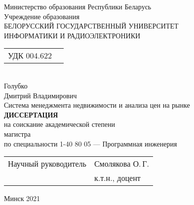 \begin{titlepage}
  \begin{center}
    Министерство образования Республики Беларусь\\[1em]
    Учреждение образования\\
    БЕЛОРУССКИЙ ГОСУДАРСТВЕННЫЙ УНИВЕРСИТЕТ \\
    ИНФОРМАТИКИ И РАДИОЭЛЕКТРОНИКИ\\[3em]

    \begin{tabular}{ p{}p{} }
      УДК 004.622 & \\
    \end{tabular}\\[5em]


    {Голубко}\\
    {Дмитрий Владимирович}\\[1em]

    {Система менеджмента недвижимости и анализа цен на рынке}\\[5em]

    \textbf{ДИССЕРТАЦИЯ}\\
    {на соискание академической степени}\\
    {магистра}\\[1em]

    {по специальности 1-40 80 05 — Программная инженерия}\\[8em]

    \begin{tabular}{ p{}p{} }
      Научный руководитель & Смолякова О.\,Г. \\
       & к.т.н., доцент\\
    \end{tabular}
    
    \vfill
    {\normalsize Минск 2021}
  \end{center}
\end{titlepage}
